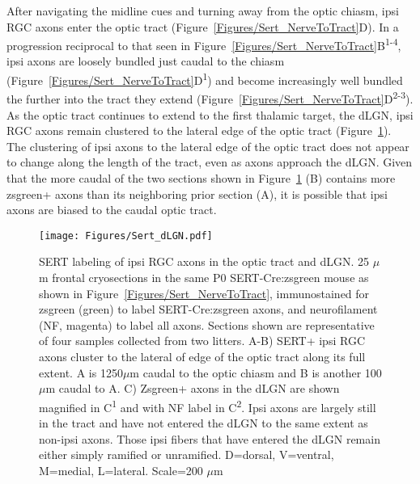 After navigating the midline cues and turning away from the optic chiasm, ipsi RGC axons enter the optic tract (Figure~\ref{Figures/Sert_NerveToTract}D).
In a progression reciprocal to that seen in Figure~\ref{Figures/Sert_NerveToTract}B\textsuperscript{1-4}, ipsi axons are loosely bundled just caudal to the chiasm (Figure~\ref{Figures/Sert_NerveToTract}D\textsuperscript{1}) and become increasingly well bundled the further into the tract they extend (Figure~\ref{Figures/Sert_NerveToTract}D\textsuperscript{2-3}).
As the optic tract continues to extend to the first thalamic target, the dLGN, ipsi RGC axons remain clustered to the lateral edge of the optic tract (Figure~\ref{Figures/Sert_dLGN}).
The clustering of ipsi axons to the lateral edge of the optic tract does not appear to change along the length of the tract, even as axons approach the dLGN.
Given that the more caudal of the two sections shown in Figure~\ref{Figures/Sert_dLGN} (B) contains more zsgreen+ axons than its neighboring prior section (A), it is possible that ipsi axons are biased to the caudal optic tract.

\begin{figure}[hbtp]
    \begin{center}
        \texttt{[image: Figures/Sert\_dLGN.pdf]}
        \caption[SERT labeling of ipsi RGC axons in the optic tract and dLGN.]
        {SERT labeling of ipsi RGC axons in the optic tract and dLGN.
        25 $\mu$ m frontal cryosections in the same P0 SERT-Cre:zsgreen mouse as shown in Figure~\ref{Figures/Sert_NerveToTract}, immunostained for zsgreen (green) to label SERT-Cre:zsgreen axons, and neurofilament (NF, magenta) to label all axons.
        Sections shown are representative of four samples collected from two litters. %
        A-B) SERT+ ipsi RGC axons cluster to the lateral of edge of the optic tract along its full extent.
        A is 1250$\mu$m caudal to the optic chiasm and B is another 100$\mu$m caudal to A.
        C) Zsgreen+ axons in the dLGN are shown magnified in C\textsuperscript{1} and with NF label in C\textsuperscript{2}.
        Ipsi axons are largely still in the tract and have not entered the dLGN to the same extent as non-ipsi axons.
        Those ipsi fibers that have entered the dLGN remain either simply ramified or unramified.
        D=dorsal, V=ventral, M=medial, L=lateral. Scale=200 $\mu$m}
        \label{Figures/Sert_dLGN}
    \end{center}
\end{figure}
